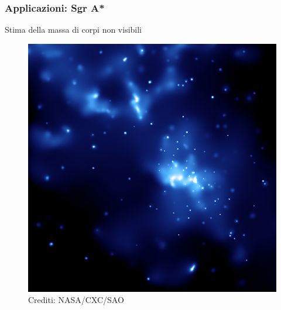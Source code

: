 \documentclass[10pt]{beamer}
\begin{document}
\begin{frame}
  \frametitle{Applicazioni: Sgr A*}
  \begin{adv}
  \item Stima della massa di corpi non visibili
  \end{adv}
  \begin{figure}
    \centering
    \includegraphics[width=0.49\columnwidth]{presentazione/sgra}
    \caption{Crediti: NASA/CXC/SAO}
  \end{figure}
\end{frame}
\end{document}
